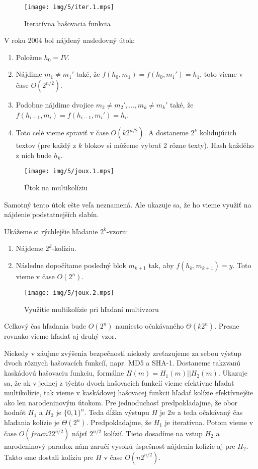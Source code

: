 \begin{figure}[h!]
    \label{fig:iter}
    \centering
    \texttt{[image: img/5/iter.1.mps]}
    \caption{Iteratívna hašovacia funkcia}
\end{figure}


V roku 2004 \cite{Joux04} bol nájdený nasledovný útok:
\begin{enumerate}
\itemsep -1.2mm
\item Položme $h_0 = IV$.
\item Nájdime $m_1 \neq m_1'$ také, že $f(h_0, m_1) = f(h_0, m_1') = h_1$, 
toto vieme v čase $O(2^{n/2})$.
\item Podobne nájdime dvojice $m_2 \neq m_2', \dots, m_k \neq m_k'$ také, 
že $f(h_{i-1}, m_i) = f(h_{i-1}, m_i') = h_i$.
\item Toto celé vieme spraviť v čase $O(k 2^{n/2})$. A dostaneme $2^k$ 
kolidujúcich textov (pre každý z $k$ blokov si môžeme vybrať
2 rôzne texty). Hash každého z nich bude $h_k$.
\end{enumerate}

\begin{figure}[h!]
    \label{fig:joux1}
    \centering
    \texttt{[image: img/5/joux.1.mps]}
    \caption{Útok na multikolíziu}
\end{figure}


Samotný tento útok ešte veľa neznamená. Ale ukazuje sa, že
ho vieme využiť na nájdenie podstatnejších slabín.

Ukážeme si rýchlejšie hľadanie $2^k$-vzoru:
\begin{enumerate}
\itemsep -1.2mm
\item Nájdeme $2^k$-kolíziu.
\item Následne dopočítame posledný blok $m_{k+1}$ tak, aby $f(h_k, m_{k+1}) = y$. Toto vieme v čase $O(2^n)$.
\end{enumerate}

\begin{figure}[h!]
    \label{fig:joux2}
    \centering
    \texttt{[image: img/5/joux.2.mps]}
    \caption{Využitie multikolízie pri hľadaní multivzoru}
\end{figure}

Celkový čas hľadania bude $O(2^n)$ namiesto očakávaného $\Theta(k 2^n)$. Presne rovnako vieme hľadať aj druhý vzor.

Niekedy v záujme zvýšenia bezpečnosti niekedy zreťazujeme za sebou výstup dvoch rôznych hašovacích funkcíí, napr.
MD5 a SHA-1. Dostaneme takzvanú kaskádovú hašovaciu funkciu, formálne $H(m) = H_1(m)||H_2(m)$. 
Ukazuje sa, že ak v jednej z týchto dvoch hašovacích funkcíí vieme efektívne hľadať multikolízie, tak vieme
v kaskádovej hašovacej funkcii hľadať kolízie efektívnejšie ako len narodeninovým útokom.
Pre jednoduchosť predpokladajme, že obor hodnôt $H_1$
a $H_2$ je $\{0,1\}^n$. Teda dĺžka výstupu $H$ je $2n$ a teda očakávaný čas hľadania kolízie je $\Theta(2^n)$.
Predpokladajme, že $H_1$ je iteratívna. Potom vieme v čase $O(frac{n}{2} 2^{n/2})$ nájsť $2^{n/2}$ kolízií. Tieto dosadíme
na vstup $H_2$ a narodeninový paradox nám zaručí vysokú úspešnosť nájdenia kolízie aj pre $H_2$. Takto sme dostali
kolíziu pre $H$ v čase $O(n 2^{n/2})$.

